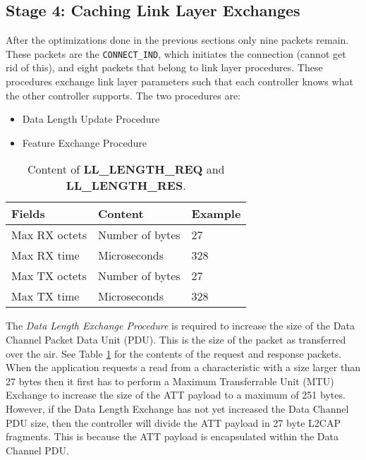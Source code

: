 \subsection{Stage 4: Caching Link Layer Exchanges}
After the optimizations done in the previous sections only nine packets remain. These packets are the \texttt{CONNECT\_IND}, which initiates the connection (cannot get rid of this), and eight packets that belong to link layer  procedures. These procedures exchange link layer parameters such that each controller knows what the other controller supports. The two procedures are:
\begin{itemize}
    \item Data Length Update Procedure
    \item Feature Exchange Procedure
\end{itemize}

\begin{table}
    \begin{center}
    \begin{tabular}{|l|l|l|}
        \hline
        \textbf{Fields} & \textbf{Content} & \textbf{Example} \\
        \hline
        Max RX octets & Number of bytes & 27 \\
        \hline
        Max RX time & Microseconds & 328 \\
        \hline
        Max TX octets & Number of bytes & 27 \\
        \hline
        Max TX time & Microseconds & 328 \\
        \hline
    \end{tabular}
    \end{center}
    \caption{Content of \textbf{LL\_LENGTH\_REQ} and \textbf{LL\_LENGTH\_RES}.}
    \label{tbl:dle_packet_content}
\end{table}

The \textit{Data Length Exchange Procedure} is required to increase the size of the Data Channel Packet Data Unit (PDU). This is the size of the packet as transferred over the air. See Table \ref{tbl:dle_packet_content} for the contents of the request and response packets. When the application requests a read from a characteristic with a size larger than 27 bytes then it first has to perform a Maximum Transferrable Unit (MTU) Exchange to increase the size of the ATT payload to a maximum of 251 bytes. However, if the Data Length Exchange has not yet increased the Data Channel PDU size, then the controller will divide the ATT payload in 27 byte L2CAP fragments. This is because the ATT payload is encapsulated within the Data Channel PDU.

